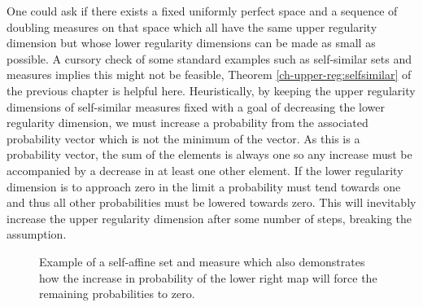 One could ask if there exists a fixed uniformly perfect space and a sequence of doubling measures on that space which all have the same upper regularity dimension but whose lower regularity dimensions can be made as small as possible. A cursory check of some standard examples such as self-similar sets and measures implies this might not be feasible, Theorem \ref{ch-upper-reg:selfsimilar} of the previous chapter is helpful here. Heuristically, by keeping the upper regularity dimensions of self-similar measures fixed with a goal of decreasing the lower regularity dimension, we must increase a probability from the associated probability vector which is not the minimum of the vector. As this is a probability vector, the sum of the elements is always one so any increase must be accompanied by a decrease in at least one other element. If the lower regularity dimension is to approach zero in the limit a probability must tend towards one and thus all other probabilities must be lowered towards zero. This will inevitably increase the upper regularity dimension after some number of steps, breaking the assumption.

\begin{figure}[h]
    \centering
    \caption{Example of a self-affine set and measure which also demonstrates how the increase in probability of the lower right map will force the remaining probabilities to zero.}
    \label{fig:pathos-ex}
\end{figure}


